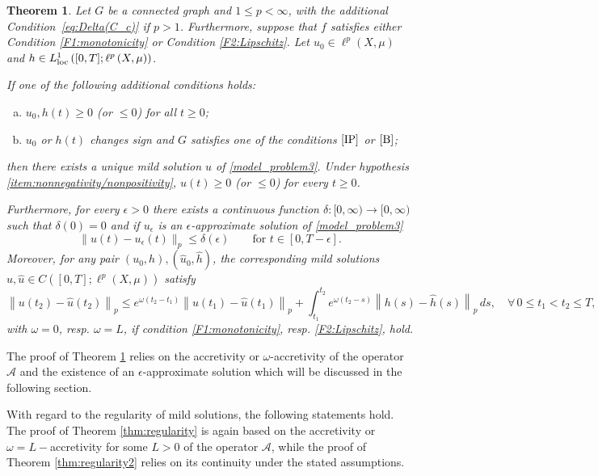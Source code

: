 \documentclass[journal]{article}
\newtheorem{theorem}{Theorem}[section]
\theoremstyle{nonitalic}
\theoremstyle{nonitalic}
\theoremstyle{plain} %
\numberwithin{equation}{section}
\begin{document}
\begin{theorem}\label{thm:main2}
	Let $G$ be a connected graph and $1\leq p <\infty$, with the additional Condition~\eqref{eq:Delta(C_c)} if $p>1$. Furthermore, suppose that $f$ satisfies either Condition \textnormal{\ref{F1:monotonicity}} or Condition \textnormal{\ref{F2:Lipschitz}}. Let $u_0 \in \ell^p(X,\mu)$ and $h \in L^1_{\textnormal{loc}}\left([0,T]; \ell^p\left(X,\mu\right)\right)$.

	If one of the following additional conditions holds:  
	\begin{enumerate}[a)]
		\item\label{item:nonnegativity/nonpositivity} $u_0,h(t)\geq 0$ (or $\leq 0$) for all $t\geq 0$;
		\item\label{hpA} $u_0$ or $h(t)$ changes sign and $G$ satisfies one of the conditions $\textnormal{\ref{IP}}$ or $\textnormal{\ref{B}}$; 
	\end{enumerate}
	then there exists a unique mild solution $u$ of \eqref{model_problem3}. Under hypothesis \ref{item:nonnegativity/nonpositivity}, $u(t)\geq 0$ (or $\leq 0$) for every $t\geq 0$.
	
	Furthermore, for every $\epsilon >0$ there exists a continuous function $\delta \colon [0,\infty) \to [0,\infty)$ such that $\delta(0)=0$ and if $u_\epsilon$ is an $\epsilon$-approximate solution of \eqref{model_problem3}
\begin{equation}\label{uniform_limit}
		\| u(t) - u_\epsilon(t)\|_p\leq \delta(\epsilon) \qquad \mbox{for } t \in [0,T-\epsilon].
	\end{equation}	   
	Moreover, for any pair $(u_0,h),(\hat{u}_0,\hat{h})$, the corresponding mild solutions $u,\hat{u} \in C\left([0,T];  \ell^p\left(X,\mu\right)\right)$ satisfy
	\begin{equation}\label{contraction_of_solutions}
		\left\| u(t_2) - \hat{u}(t_2)  \right\|_p \leq e^{\omega(t_2-t_1)}\left\| u(t_1) - \hat{u}(t_1)  \right\|_p   + \int_{t_1}^{t_2}e^{\omega(t_2-s)}\left\| h(s) - \hat{h}(s) \right\|_p\, ds, \quad \forall \, 0\leq t_1<t_2 \leq T,
	\end{equation}
with $\omega=0$, resp. $\omega=L$, if condition \textnormal{\ref{F1:monotonicity}}, resp. \textnormal{\ref{F2:Lipschitz}}, hold.	
\end{theorem}
The proof of Theorem \ref{thm:main2} relies on the accretivity or $\omega$-accretivity of the operator $\mathcal A$ and the existence of an $\epsilon$-approximate solution which will be discussed in the following section.  \par
With regard to the regularity of mild solutions, the following statements hold. The proof of Theorem \ref{thm:regularity} is again based on the accretivity or $\omega=L-$accretivity for some $L>0$ of the operator $\mathcal A$, while the proof of Theorem \ref{thm:regularity2} relies on its continuity under the stated assumptions.
\end{document}
